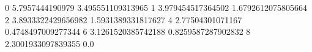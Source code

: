 0 5.7957444190979 3.495551109313965
1 3.979454517364502 1.6792612075805664
2 3.8933322429656982 1.5931389331817627
4 2.77504301071167 0.4748497009277344
6 3.1261520385742188 0.8259587287902832
8 2.3001933097839355 0.0
